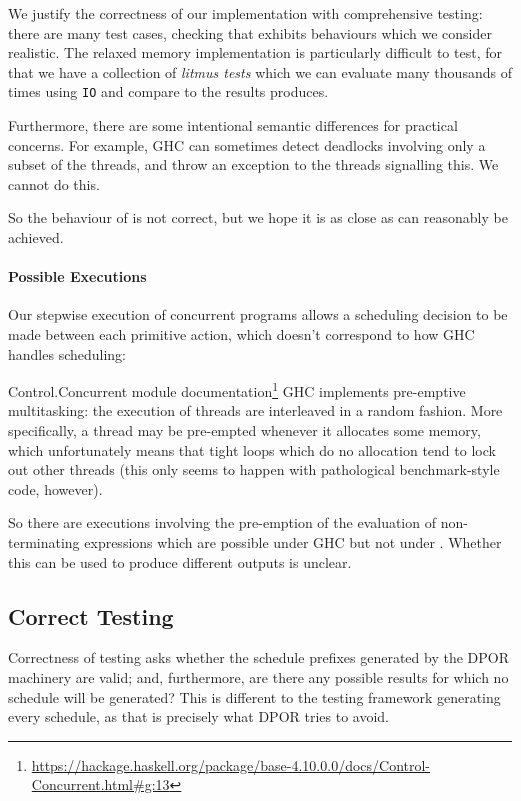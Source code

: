We justify the correctness of our implementation with comprehensive
testing: there are many test cases, checking that \dejafu{} exhibits
behaviours which we consider realistic.  The relaxed memory
implementation is particularly difficult to test, for that we have a
collection of \emph{litmus tests} which we can evaluate many thousands
of times using \verb|IO| and compare to the results \dejafu{}
produces.

Furthermore, there are some intentional semantic differences for
practical concerns.  For example, GHC can sometimes detect deadlocks
involving only a subset of the threads, and throw an exception to the
threads signalling this.  We cannot do this.

So the behaviour of \dejafu{} is not correct, but we hope it is as
close as can reasonably be achieved.

\paragraph{Possible Executions}
Our stepwise execution of concurrent programs allows a scheduling
decision to be made between each primitive action, which doesn't
correspond to how GHC handles scheduling:

\begin{bquote}{Control.Concurrent module documentation\footnote{\url{https://hackage.haskell.org/package/base-4.10.0.0/docs/Control-Concurrent.html\#g:13}}}
  GHC implements pre-emptive multitasking: the execution of threads
  are interleaved in a random fashion.  More specifically, a thread may
  be pre-empted whenever it allocates some memory, which unfortunately
  means that tight loops which do no allocation tend to lock out other
  threads (this only seems to happen with pathological benchmark-style
  code, however).
\end{bquote}

So there are executions involving the pre-emption of the evaluation of
non-terminating expressions which are possible under GHC but not under
\dejafu{}.  Whether this can be used to produce different outputs is
unclear.

\subsection{Correct Testing}

Correctness of testing asks whether the schedule prefixes generated by
the DPOR machinery are valid; and, furthermore, are there any possible
results for which no schedule will be generated?  This is different to
the testing framework generating every schedule, as that is precisely
what DPOR tries to avoid.


